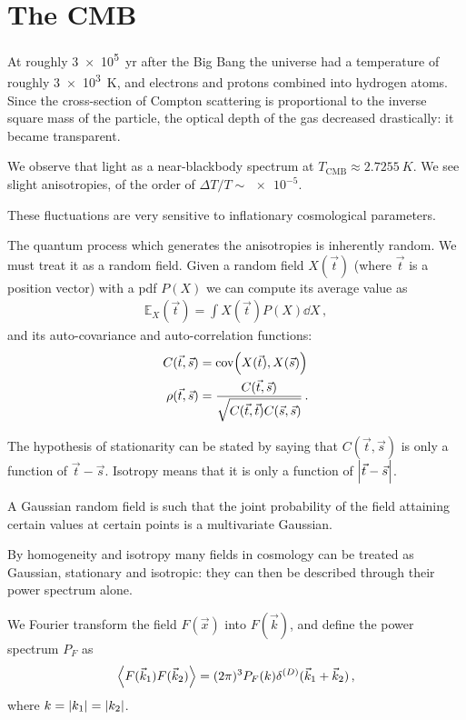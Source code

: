\documentclass[main.tex]{subfiles}
\begin{document}
\section{The CMB}

At roughly \SI{3e5}{yr} after the Big Bang the universe had a temperature of roughly \SI{3e3}{K}, and electrons and protons combined into hydrogen atoms.
Since the cross-section of Compton scattering is proportional to the inverse square mass of the particle, the optical depth of the gas decreased drastically: it became transparent. 

We observe that light as a near-blackbody spectrum at \(T _{\text{CMB}} \approx \SI{2.7255}{K}\). 
We see slight anisotropies, of the order of \(\Delta T / T \sim \num{e-5}\). 

These fluctuations are very sensitive to inflationary cosmological parameters. 

The quantum process which generates the anisotropies is inherently random. We must treat it as a random field. 
Given a random field \(X(\vec{t})\) (where \(\vec{t}\) is a position vector) with a pdf \(P(X)\) we can compute its average value as 
%
\begin{align}
\mathbb{E}_X(\vec{t}) = \int X(\vec{t}) P(X) \dd{X}
\,,
\end{align}
%
and its auto-covariance and auto-correlation functions: 
%
\begin{align}
C(\vec{t}, \vec{s}) &= \text{cov} \qty( X(\vec{t}), X(\vec{s}))  \\
\rho (\vec{t}, \vec{s}) &= \frac{C(\vec{t}, \vec{s})}{\sqrt{C(\vec{t}, \vec{t}) C(\vec{s}, \vec{s})}}
\,.
\end{align}

The hypothesis of stationarity can be stated by saying that \(C(\vec{t}, \vec{s})\) is only a function of \(\vec{t}-\vec{s}\).  
Isotropy means that it is only a function of \(\abs{\vec{t} - \vec{s}}\). 

A Gaussian random field is such that the joint probability of the field attaining certain values at certain points is a multivariate Gaussian. 

By homogeneity and isotropy many fields in cosmology can be treated as Gaussian, stationary and isotropic: they can then be described through their power spectrum alone. 

We Fourier transform the field \(F(\vec{x})\) into \(F(\vec{k})\), and define the power spectrum \(P_F\) as 
%
\begin{align}
\expval{F(\vec{k}_1) F(\vec{k}_2)} = (2 \pi )^3 P_F(k) \delta^{(D)} (\vec{k}_1 + \vec{k}_2)
\,,
\end{align}
%
where \(k = \abs{k_1 } = \abs{ k_2 }\).
\end{document}
